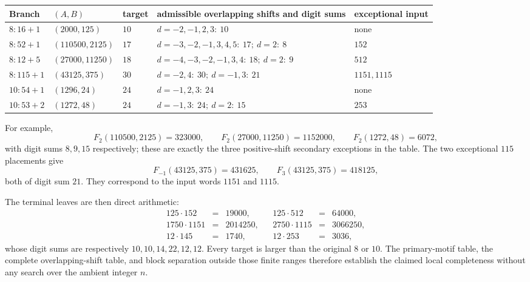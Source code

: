 \documentclass[11pt]{article}
\begin{document}
\begin{center}
\footnotesize
\setlength{\tabcolsep}{3.5pt}
\begin{tabular}{@{}lllll@{}}
\toprule
Branch & $(A,B)$ & target & admissible overlapping shifts and digit sums & exceptional input \\
\midrule
$8:16+1$ & $(2000,125)$ & $10$
 & $d=-2,-1,2,3:\ 10$ & none \\
$8:52+1$ & $(110500,2125)$ & $17$
 & $d=-3,-2,-1,3,4,5:\ 17;\ d=2:\ 8$ & $152$ \\
$8:12+5$ & $(27000,11250)$ & $18$
 & $d=-4,-3,-2,-1,3,4:\ 18;\ d=2:\ 9$ & $512$ \\
$8:115+1$ & $(43125,375)$ & $30$
 & $d=-2,4:\ 30;\ d=-1,3:\ 21$ & $1151,1115$ \\
$10:54+1$ & $(1296,24)$ & $24$
 & $d=-1,2,3:\ 24$ & none \\
$10:53+2$ & $(1272,48)$ & $24$
 & $d=-1,3:\ 24;\ d=2:\ 15$ & $253$ \\
\bottomrule
\end{tabular}
\end{center}

For example,
\[
 F_2(110500,2125)=323000,
 \qquad
 F_2(27000,11250)=1152000,
 \qquad
 F_2(1272,48)=6072,
\]
with digit sums $8,9,15$ respectively; these are exactly the three positive-shift secondary exceptions in the table.  The two exceptional $115$ placements give
\[
 F_{-1}(43125,375)=431625,
 \qquad
 F_3(43125,375)=418125,
\]
both of digit sum $21$.  They correspond to the input words $1151$ and $1115$.

The terminal leaves are then direct arithmetic:
\[
\begin{array}{rclcrcl}
125\cdot152&=&19000,&&125\cdot512&=&64000,\\
1750\cdot1151&=&2014250,&&2750\cdot1115&=&3066250,\\
12\cdot145&=&1740,&&12\cdot253&=&3036,
\end{array}
\]
whose digit sums are respectively $10,10,14,22,12,12$.  Every target is larger than the original $8$ or $10$.  The primary-motif table, the complete overlapping-shift table, and block separation outside those finite ranges therefore establish the claimed local completeness without any search over the ambient integer $n$.
\end{document}

